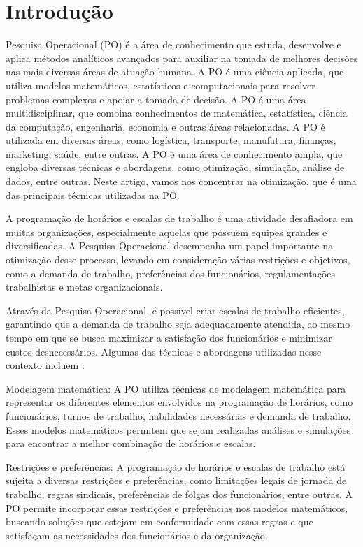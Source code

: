 \section{Introdução}

Pesquisa Operacional (PO) é a área de conhecimento que estuda, desenvolve e aplica métodos analíticos avançados para auxiliar na tomada de melhores decisões nas mais diversas áreas de atuação humana. A PO é uma ciência aplicada, que utiliza modelos matemáticos, estatísticos e computacionais para resolver problemas complexos e apoiar a tomada de decisão. A PO é uma área multidisciplinar, que combina conhecimentos de matemática, estatística, ciência da computação, engenharia, economia e outras áreas relacionadas. A PO é utilizada em diversas áreas, como logística, transporte, manufatura, finanças, marketing, saúde, entre outras. A PO é uma área de conhecimento ampla, que engloba diversas técnicas e abordagens, como otimização, simulação, análise de dados, entre outras. Neste artigo, vamos nos concentrar na otimização, que é uma das principais técnicas utilizadas na PO.

A programação de horários e escalas de trabalho é uma atividade desafiadora em muitas organizações, especialmente aquelas que possuem equipes grandes e diversificadas. A Pesquisa Operacional desempenha um papel importante na otimização desse processo, levando em consideração várias restrições e objetivos, como a demanda de trabalho, preferências dos funcionários, regulamentações trabalhistas e metas organizacionais.

Através da Pesquisa Operacional, é possível criar escalas de trabalho eficientes, garantindo que a demanda de trabalho seja adequadamente atendida, ao mesmo tempo em que se busca maximizar a satisfação dos funcionários e minimizar custos desnecessários. Algumas das técnicas e abordagens utilizadas nesse contexto incluem  \cite{Sobre_a_CBO}:

Modelagem matemática: A PO utiliza técnicas de modelagem matemática para representar os diferentes elementos envolvidos na programação de horários, como funcionários, turnos de trabalho, habilidades necessárias e demanda de trabalho. Esses modelos matemáticos permitem que sejam realizadas análises e simulações para encontrar a melhor combinação de horários e escalas.

Restrições e preferências: A programação de horários e escalas de trabalho está sujeita a diversas restrições e preferências, como limitações legais de jornada de trabalho, regras sindicais, preferências de folgas dos funcionários, entre outras. A PO permite incorporar essas restrições e preferências nos modelos matemáticos, buscando soluções que estejam em conformidade com essas regras e que satisfaçam as necessidades dos funcionários e da organização.

